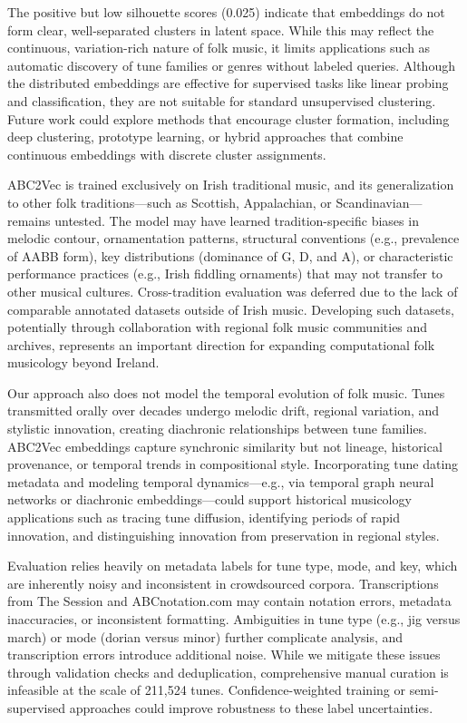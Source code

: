 \documentclass[]{interact}
\theoremstyle{plain}
\theoremstyle{definition}
\theoremstyle{remark}
\begin{document}
The positive but low silhouette scores (0.025) indicate that embeddings do not form clear, well-separated clusters in latent space. While this may reflect the continuous, variation-rich nature of folk music, it limits applications such as automatic discovery of tune families or genres without labeled queries. Although the distributed embeddings are effective for supervised tasks like linear probing and classification, they are not suitable for standard unsupervised clustering. Future work could explore methods that encourage cluster formation, including deep clustering, prototype learning, or hybrid approaches that combine continuous embeddings with discrete cluster assignments.

ABC2Vec is trained exclusively on Irish traditional music, and its generalization to other folk traditions—such as Scottish, Appalachian, or Scandinavian—remains untested. The model may have learned tradition-specific biases in melodic contour, ornamentation patterns, structural conventions (e.g., prevalence of AABB form), key distributions (dominance of G, D, and A), or characteristic performance practices (e.g., Irish fiddling ornaments) that may not transfer to other musical cultures. Cross-tradition evaluation was deferred due to the lack of comparable annotated datasets outside of Irish music. Developing such datasets, potentially through collaboration with regional folk music communities and archives, represents an important direction for expanding computational folk musicology beyond Ireland.

Our approach also does not model the temporal evolution of folk music. Tunes transmitted orally over decades undergo melodic drift, regional variation, and stylistic innovation, creating diachronic relationships between tune families. ABC2Vec embeddings capture synchronic similarity but not lineage, historical provenance, or temporal trends in compositional style. Incorporating tune dating metadata and modeling temporal dynamics—e.g., via temporal graph neural networks or diachronic embeddings—could support historical musicology applications such as tracing tune diffusion, identifying periods of rapid innovation, and distinguishing innovation from preservation in regional styles.

Evaluation relies heavily on metadata labels for tune type, mode, and key, which are inherently noisy and inconsistent in crowdsourced corpora. Transcriptions from The Session and ABCnotation.com may contain notation errors, metadata inaccuracies, or inconsistent formatting. Ambiguities in tune type (e.g., jig versus march) or mode (dorian versus minor) further complicate analysis, and transcription errors introduce additional noise. While we mitigate these issues through validation checks and deduplication, comprehensive manual curation is infeasible at the scale of 211,524 tunes. Confidence-weighted training or semi-supervised approaches could improve robustness to these label uncertainties.
\end{document}
